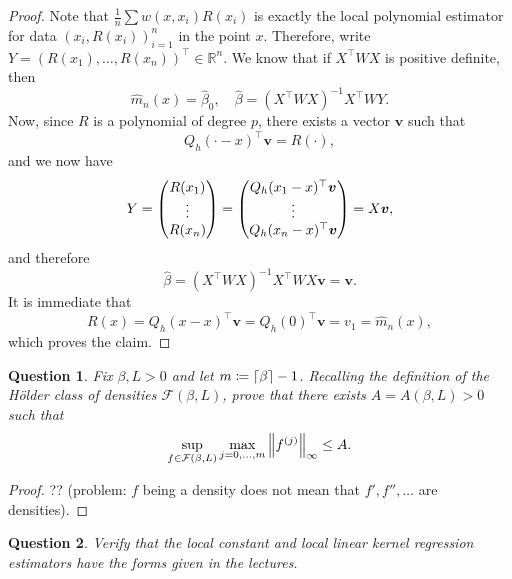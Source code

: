 \documentclass{article}
\theoremstyle{plain}
\newtheorem{question}{Question}
\theoremstyle{remark}
\renewcommand{\vec}{\boldsymbol}
\newcommand{\Bb}{\mathbb}
\newcommand{\Cal}{\mathcal}
\newcommand{\RR}{\Bb R}
\newcommand\FF{\Cal F}
\DeclarePairedDelimiter{\ceil}{\lceil}{\rceil}
\newcommand{\T}{^\top} %
\newcommand\ceq\coloneqq %
\begin{document}
\begin{proof}
	Note that $\frac1n \sum w(x, x_i) R(x_i)$ is exactly the local polynomial estimator for data $(x_i, R(x_i))_{i=1}^n$ in the point $x$. Therefore, write $Y = (R(x_1), \dotsc, R(x_n))\T \in \RR^n$. 
	We know that if $X\T W X$ is positive definite, then
	\[
	\hat m_n(x) = \hat\beta_0, \quad\hat\beta = (X\T W X)^{-1} X\T W Y. 
	\]
	Now, since $R$ is a polynomial of degree $p$, there exists a vector $\vec v$ such that
	\[
	Q_h(\cdot - x)\T \vec v = R(\cdot),
	\]
	and we now have
	\[
	Y = \mqty(R(x_1) \\ \vdots  \\ R(x_n)) = \mqty(Q_h(x_1 - x)\T \vec v \\ \vdots \\ Q_h(x_n - x)\T \vec v) = X\vec v, 
	\]
	and therefore
	\[
	\hat\beta = (X\T W X)^{-1} X\T W X \vec v = \vec v. 
	\]
	It is immediate that
	\[
	R(x) = Q_h(x - x)\T \vec v = Q_h(0)\T \vec v = v_1 = \hat m_n(x), 
	\]
	which proves the claim. 
\end{proof}

\begin{question}
	Fix $\beta, L > 0$ and let $m \ceq \ceil{\beta} - 1$. Recalling the definition of the H\"older class of densities $\FF(\beta, L)$, prove that there exists $A = A(\beta, L) > 0$ such that
	\[
	\sup_{f \in \FF(\beta, L)} \max_{j = 0, \dotsc, m} \norm{f^{(j)}}_\infty \leq A. 
	\]
\end{question}

\begin{proof}
	?? (problem: $f$ being a density does not mean that $f', f'', \dotsc$ are densities). 
\end{proof}

\begin{question}
	Verify that the local constant and local linear kernel regression estimators have the forms given in the lectures. 
\end{question}
\end{document}
